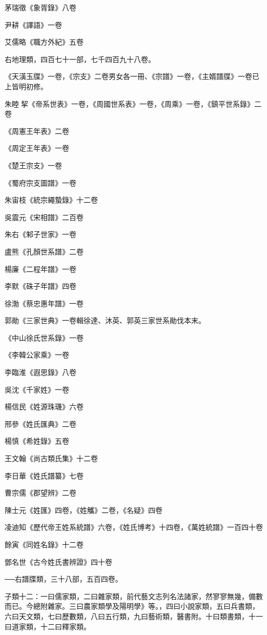 茅瑞徵《象胥錄》八卷

尹耕《譯語》一卷

艾儒略《職方外紀》五卷

右地理類，四百七十一部，七千四百九十八卷。

《天潢玉牒》一卷，《宗支》二卷男女各一冊、《宗譜》一卷，《主婿譜牒》一卷已上皆明初修。

朱睦挈《帝系世表》一卷，《周國世系表》一卷，《周乘》一卷，《鎮平世系錄》二卷

《周憲王年表》二卷

《周定王年表》一卷

《楚王宗支》一卷

《蜀府宗支圖譜》一卷

朱宙枝《統宗繩蟄錄》十二卷

吳震元《宋相譜》二百卷

朱右《邾子世家》一卷

盧熊《孔顏世系譜》二卷

楊廉《二程年譜》一卷

李默《硃子年譜》四卷

徐渤《蔡忠惠年譜》一卷

郭勛《三家世典》一卷輯徐達、沐英、郭英三家世系勛伐本末。

《中山徐氏世系錄》一卷

《李韓公家乘》一卷

李臨淮《遐思錄》八卷

吳沈《千家姓》一卷

楊信民《姓源珠璣》六卷

邢參《姓氏匯典》二卷

楊慎《希姓錄》五卷

王文翰《尚古類氏集》十二卷

李日華《姓氏譜纂》七卷

曹宗儒《郡望辨》二卷

陳士元《姓匯》四卷，《姓觿》二卷，《名疑》四卷

凌迪知《歷代帝王姓系統譜》六卷，《姓氏博考》十四卷，《萬姓統譜》一百四十卷

餘寅《同姓名錄》十二卷

鄧名世《古今姓氏書辨證》四十卷

──右譜牒類，三十八部，五百四卷。

子類十二：一曰儒家類，二曰雜家類，前代藝文志列名法諸家，然寥寥無幾，備數而已。今總附雜家。三曰農家類學及陽明學》等。，四曰小說家類，五曰兵書類，六曰天文類，七曰歷數類，八曰五行類，九曰藝術類，醫書附。十曰類書類，十一曰道家類，十二曰釋家類。

